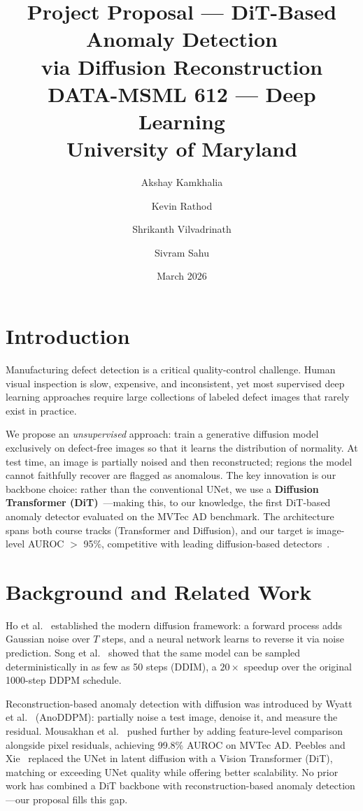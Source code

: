 \documentclass[12pt,a4paper]{article}
\title{%
  \textbf{Project Proposal --- DiT-Based Anomaly Detection\\via Diffusion Reconstruction}\\[6pt]
  \large DATA-MSML 612 --- Deep Learning\\
  University of Maryland
}
\author{Akshay Kamkhalia \and Kevin Rathod \and Shrikanth Vilvadrinath \and Sivram Sahu}
\date{March 2026}
\begin{document}
\maketitle

\section{Introduction}

Manufacturing defect detection is a critical quality-control challenge.
Human visual inspection is slow, expensive, and inconsistent, yet most supervised
deep learning approaches require large collections of labeled defect images that
rarely exist in practice.

We propose an \textit{unsupervised} approach: train a generative diffusion model
exclusively on defect-free images so that it learns the distribution of normality.
At test time, an image is partially noised and then reconstructed; regions the
model cannot faithfully recover are flagged as anomalous. The key innovation is
our backbone choice: rather than the conventional UNet, we use a
\textbf{Diffusion Transformer (DiT)}~\cite{peebles2023}---making this, to our
knowledge, the first DiT-based anomaly detector evaluated on the MVTec AD
benchmark. The architecture spans both course tracks (Transformer and Diffusion),
and our target is image-level AUROC $>$ 95\%, competitive with leading
diffusion-based detectors~\cite{mousakhan2023}.

\section{Background and Related Work}

Ho et al.~\cite{ho2020} established the modern diffusion framework: a forward
process adds Gaussian noise over $T$ steps, and a neural network learns to
reverse it via noise prediction. Song et al.~\cite{song2021} showed that the
same model can be sampled deterministically in as few as 50 steps (DDIM), a
$20\times$ speedup over the original 1000-step DDPM schedule.

Reconstruction-based anomaly detection with diffusion was introduced by
Wyatt et al.~\cite{wyatt2022} (AnoDDPM): partially noise a test image, denoise
it, and measure the residual. Mousakhan et al.~\cite{mousakhan2023} pushed
further by adding feature-level comparison alongside pixel residuals, achieving
99.8\% AUROC on MVTec AD. Peebles and Xie~\cite{peebles2023} replaced the UNet
in latent diffusion with a Vision Transformer (DiT), matching or exceeding UNet
quality while offering better scalability. No prior work has combined a DiT
backbone with reconstruction-based anomaly detection---our proposal fills this
gap.
\end{document}
